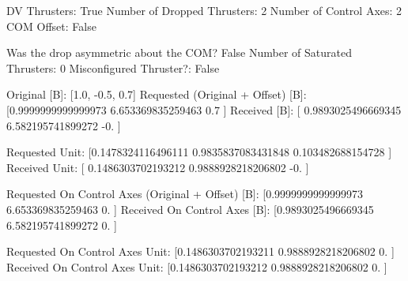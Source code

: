 DV Thrusters:	True
Number of Dropped Thrusters:	2
Number of Control Axes:	2
COM Offset:	False

Was the drop asymmetric about the COM?	False
Number of Saturated Thrusters:	0
Misconfigured Thruster?:	False

Original [B]:	[1.0, -0.5, 0.7]
Requested (Original + Offset) [B]:	[0.9999999999999973 6.653369835259463  0.7               ]
Received [B]:		[ 0.9893025496669345  6.582195741899272  -0.                ]

Requested Unit:		[0.1478324116496111 0.9835837083431848 0.103482688154728 ]
Received Unit:		[ 0.1486303702193212  0.9888928218206802 -0.                ]

Requested On Control Axes (Original + Offset) [B]:	[0.9999999999999973 6.653369835259463  0.                ]
Received On Control Axes [B]:		[0.9893025496669345 6.582195741899272  0.                ]

Requested On Control Axes Unit:		[0.1486303702193211 0.9888928218206802 0.                ]
Received On Control Axes Unit:		[0.1486303702193212 0.9888928218206802 0.                ]

